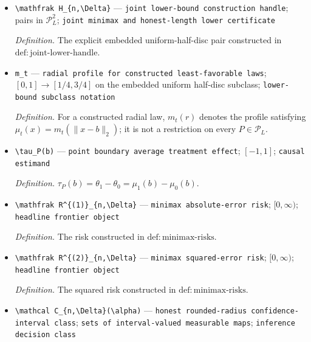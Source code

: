 \documentclass{article}
\begin{document}
\begin{itemize}
  \item \texttt{\textbackslash{}\allowbreak{}mathfrak H\_\allowbreak{}\{n,\allowbreak{}\textbackslash{}\allowbreak{}Delta\}\allowbreak{}} --- \texttt{joint lower-\allowbreak{}bound construction handle}; pairs in \(\mathcal P_L^2\); \texttt{joint minimax and honest-\allowbreak{}length lower certificate}
  \par\smallskip\noindent\emph{Definition.} The explicit embedded uniform-half-disc pair constructed in \(\mathrm{def:joint\text{-}lower\text{-}handle}\).
  \item \texttt{m\_\allowbreak{}t} --- \texttt{radial profile for constructed least-\allowbreak{}favorable laws}; \([0,1]\to[1/4,3/4]\) on the embedded uniform half-disc subclass; \texttt{lower-\allowbreak{}bound subclass notation}
  \par\smallskip\noindent\emph{Definition.} For a constructed radial law, \(m_t(r)\) denotes the profile satisfying \(\mu_t(x)=m_t(\lVert x-b\rVert_2)\); it is not a restriction on every \(P\in\mathcal P_L\).
  \item \texttt{\textbackslash{}\allowbreak{}tau\_\allowbreak{}P(b)} --- \texttt{point boundary average treatment effect}; \([-1,1]\); \texttt{causal estimand}
  \par\smallskip\noindent\emph{Definition.} \(\tau_P(b)=\theta_1-\theta_0=\mu_1(b)-\mu_0(b)\).
  \item \texttt{\textbackslash{}\allowbreak{}mathfrak R\textasciicircum{}\{(1)\}\allowbreak{}\_\allowbreak{}\{n,\allowbreak{}\textbackslash{}\allowbreak{}Delta\}\allowbreak{}} --- \texttt{minimax absolute-\allowbreak{}error risk}; \([0,\infty)\); \texttt{headline frontier object}
  \par\smallskip\noindent\emph{Definition.} The risk constructed in \(\mathrm{def:minimax\text{-}risks}\).
  \item \texttt{\textbackslash{}\allowbreak{}mathfrak R\textasciicircum{}\{(2)\}\allowbreak{}\_\allowbreak{}\{n,\allowbreak{}\textbackslash{}\allowbreak{}Delta\}\allowbreak{}} --- \texttt{minimax squared-\allowbreak{}error risk}; \([0,\infty)\); \texttt{headline frontier object}
  \par\smallskip\noindent\emph{Definition.} The squared risk constructed in \(\mathrm{def:minimax\text{-}risks}\).
  \item \texttt{\textbackslash{}\allowbreak{}mathcal C\_\allowbreak{}\{n,\allowbreak{}\textbackslash{}\allowbreak{}Delta\}\allowbreak{}(\textbackslash{}\allowbreak{}alpha)} --- \texttt{honest rounded-\allowbreak{}radius confidence-\allowbreak{}interval class}; \texttt{sets of interval-\allowbreak{}valued measurable maps}; \texttt{inference decision class}

\end{itemize}
\end{document}
